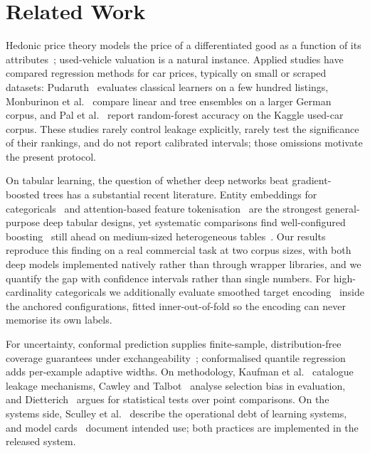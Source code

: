 \documentclass[journal,10pt]{IEEEtran}
\begin{document}
\section{Related Work}
\label{sec:related}
Hedonic price theory models the price of a differentiated good as a function of its attributes~\cite{rosen1974}; used-vehicle valuation is a natural instance. Applied studies have compared regression methods for car prices, typically on small or scraped datasets: Pudaruth~\cite{pudaruth2014} evaluates classical learners on a few hundred listings, Monburinon et al.~\cite{monburinon2018} compare linear and tree ensembles on a larger German corpus, and Pal et al.~\cite{pal2019} report random-forest accuracy on the Kaggle used-car corpus. These studies rarely control leakage explicitly, rarely test the significance of their rankings, and do not report calibrated intervals; those omissions motivate the present protocol.

On tabular learning, the question of whether deep networks beat gradient-boosted trees has a substantial recent literature. Entity embeddings for categoricals~\cite{guo2016} and attention-based feature tokenisation~\cite{gorishniy2021} are the strongest general-purpose deep tabular designs, yet systematic comparisons find well-configured boosting~\cite{ke2017,chen2016,prokhorenkova2018} still ahead on medium-sized heterogeneous tables~\cite{shwartz2022,grinsztajn2022}. Our results reproduce this finding on a real commercial task at two corpus sizes, with both deep models implemented natively rather than through wrapper libraries, and we quantify the gap with confidence intervals rather than single numbers. For high-cardinality categoricals we additionally evaluate smoothed target encoding~\cite{micci2001} inside the anchored configurations, fitted inner-out-of-fold so the encoding can never memorise its own labels.

For uncertainty, conformal prediction supplies finite-sample, distribution-free coverage guarantees under exchangeability~\cite{vovk2005,lei2018,angelopoulos2023}; conformalised quantile regression~\cite{romano2019} adds per-example adaptive widths. On methodology, Kaufman et al.~\cite{kaufman2012} catalogue leakage mechanisms, Cawley and Talbot~\cite{cawley2010} analyse selection bias in evaluation, and Dietterich~\cite{dietterich1998} argues for statistical tests over point comparisons. On the systems side, Sculley et al.~\cite{sculley2015} describe the operational debt of learning systems, and model cards~\cite{mitchell2019} document intended use; both practices are implemented in the released system.
\end{document}
